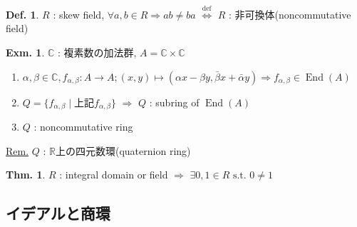 \documentclass[uplatex,dvipdfmx,9pt]{beamer}
\newcommand{\defarrow}{\overset{\mathrm{def}}{\Leftrightarrow}}
\newcommand{\st}{\text{ s.t. }}
\newcommand{\End}[1]{\operatorname{End}(#1)}
\newcommand{\R}{\mathbb{R}}
\newcommand{\C}{\mathbb{C}}
\newcommand{\sscount}{\textsection \thesubsection}
\newcounter{textExmCount}
\theoremstyle{definition} %
\newtheorem{defn}{Def.}[subsection] %
\newtheorem{thm}{Thm.}[subsection] %
\theoremstyle{example}
\newtheorem{exmText}[textExmCount]{Exm.}
\begin{document}
    \begin{frame}

      \begin{defn}
        $R$ : skew field, $\forall a,b \in R \Rightarrow ab \neq ba$ $\defarrow$ $R$ : \alert{非可換体(noncommutative field)}
      \end{defn}

      \begin{exmText}
        $\C$ : 複素数の加法群, $A = \C \times \C$
        \begin{enumerate}
          \item $\alpha, \beta \in \C, f_{\alpha, \beta}\colon A \to A ; (x,y) \mapsto (\alpha x - \beta y, \bar{\beta} x + \bar{\alpha} y) \Rightarrow f_{\alpha, \beta} \in \End{A}$
          \item $Q = \{f_{\alpha, \beta} \mid \text{上記$f_{\alpha, \beta}$}\}$ $\Rightarrow$ $Q$ : subring of $\End{A}$
          \item $Q$ : noncommutative ring
        \end{enumerate}
      \end{exmText}
      \underline{Rem.} $Q$ : $\R$上の\alert{四元数環(quaternion ring)}

      \begin{thm}
        $R$ : integral domain or field $\Rightarrow$ $\exists 0, 1 \in R \st 0 \neq 1$
      \end{thm}
      
    \end{frame}

    \subsection{\sscount イデアルと商環}
    \setcounter{textExmCount}{0}
\end{document}
